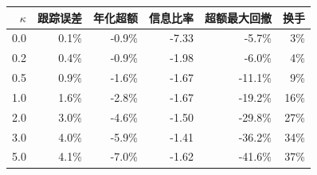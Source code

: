 \begin{tabular}{@{}rrrrrr@{}}
\toprule
$\kappa$ & 跟踪误差 & 年化超额 & 信息比率 & 超额最大回撤 & 换手 \\
\midrule
0.0 & 0.1\% & -0.9\% & -7.33 & -5.7\% & 3\% \\
0.2 & 0.4\% & -0.9\% & -1.98 & -6.0\% & 4\% \\
0.5 & 0.9\% & -1.6\% & -1.67 & -11.1\% & 9\% \\
1.0 & 1.6\% & -2.8\% & -1.67 & -19.2\% & 16\% \\
2.0 & 3.0\% & -4.6\% & -1.50 & -29.8\% & 27\% \\
3.0 & 4.0\% & -5.9\% & -1.41 & -36.2\% & 34\% \\
5.0 & 4.1\% & -7.0\% & -1.62 & -41.6\% & 37\% \\
\bottomrule
\end{tabular}
